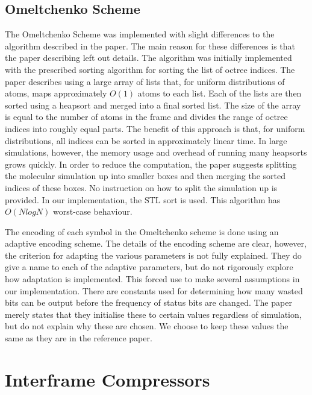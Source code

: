 \documentclass[a4paper,11pt]{report}
\begin{document}
\subsection{Omeltchenko Scheme}

\label{imp_omelt}
The Omeltchenko Scheme was implemented with slight differences to the algorithm described in the paper. The main reason for these differences is that the paper describing left out details. The algorithm was initially implemented with the prescribed sorting algorithm for sorting the list of octree indices. The paper describes using a large array of lists that, for uniform distributions of atoms, maps approximately $O(1)$ atoms to each list. Each of the lists are then sorted using a heapsort and merged into a final sorted list. The size of the array is equal to the number of atoms in the frame and divides the range of octree indices into roughly equal parts. The benefit of this approach is that, for uniform distributions, all indices can be sorted in approximately linear time.  In large simulations, however, the memory usage and overhead of running many heapsorts grows quickly. In order to reduce the computation, the paper suggests splitting the molecular simulation up into smaller boxes and then merging the sorted indices of these boxes. No instruction on how to split the simulation up is provided. In our implementation, the STL sort is used. This algorithm has $O(NlogN)$ worst-case behaviour.

The encoding of each symbol in the Omeltchenko scheme is done using an adaptive encoding scheme. The details of the encoding scheme are clear, however, the criterion for adapting the various parameters is not fully explained. They do give a name to each of the adaptive parameters, but do not rigorously explore how adaptation is implemented. This forced use to make several assumptions in our implementation. There are constants used for determining how many wasted bits can be output before the frequency of status bits are changed. The paper merely states that they initialise these to certain values regardless of simulation, but do not explain why these are chosen. We choose to keep these values the same as they are in the reference paper.

\section{Interframe Compressors}
\end{document}
